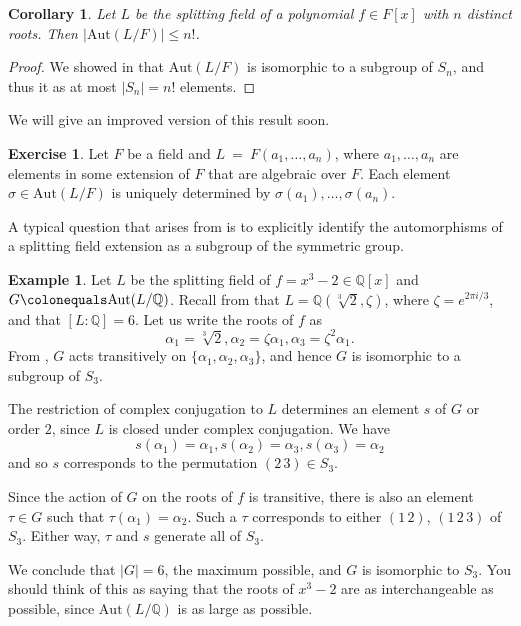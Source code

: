 \documentclass[12pt]{report}
\newtheorem{corollary}[theorem]{Corollary}
\numberwithin{equation}{section}
\numberwithin{theorem}{chapter}
\theoremstyle{definition}
\newtheorem{example}[theorem]{Example}
\newtheorem{exercise}{Exercise}
\newtheorem*{basic properties}{Basic Properties}
\newtheorem*{Important Remark}{Important Remark}
\begin{document}
\begin{corollary}
Let $L$ be the splitting field of a polynomial $f \in F[x]$ with $n$ distinct roots. Then $|\mathrm{Aut}(L/F)| \leqslant n!$.
\end{corollary}

\begin{proof}
	We showed in  that $\mathrm{Aut}(L/F)$ is isomorphic to a subgroup of $S_n$, and thus it as at most $|S_n| = n!$ elements.
\end{proof}

We will give an improved version of this result soon.


\begin{exercise}\label{aut elements determined by image of gens}
Let $F$ be a field and $L~=~F(a_1, \ldots, a_n)$, where $a_1,\ldots, a_n$ are elements in some extension of $F$ that are algebraic over $F$. Each element $\sigma \in \mathrm{Aut}(L/F)$ is uniquely determined by $\sigma(a_1),\ldots, \sigma(a_n)$.
\end{exercise}

A typical question that arises from  is to explicitly identify the automorphisms of a splitting field extension as a subgroup of the symmetric group.

\begin{example} 
Let $L$ be the splitting field of $f = x^3-2 \in \mathbb{Q}[x]$ and $G \colonequals \mathrm{Aut}(L/\mathbb{Q})$. Recall from  that $L = \mathbb{Q}(\sqrt[3]{2}, \zeta)$, where $\zeta = e^{2 \pi i/3}$, and that $[L:\mathbb{Q}] = 6$.
Let us write the roots of $f$ as 
$$\alpha_1 = \sqrt[3]{2}, \alpha_2 = \zeta \alpha_1, \alpha_3 = \zeta^2 \alpha_1.$$
From , $G$ acts transitively on $\{\alpha_1, \alpha_2, \alpha_3\}$, and hence $G$ is isomorphic to a subgroup of $S_3$.

The restriction of complex conjugation to $L$ determines an element $s$ of $G$ or order $2$, since $L$ is closed under complex conjugation. We have 
$$s(\alpha_1) = \alpha_1, s(\alpha_2) = \alpha_3, s(\alpha_3) = \alpha_2$$
and so $s$ corresponds to the permutation $(2 \, 3) \in S_3$.

Since the action of $G$ on the roots of $f$ is transitive, there is also an element $\tau \in G$ such that $\tau(\alpha_1) = \alpha_2$. Such a $\tau$ corresponds to either $(1 \, 2)$, $(1 \, 2 \, 3)$ of $S_3$. Either way, $\tau$ and $s$ generate all of $S_3$.

We conclude that $|G| = 6$, the maximum possible, and $G$ is isomorphic to $S_3$. You should think of this as saying that the roots of $x^3 -2$ are as interchangeable as possible, since $\mathrm{Aut}(L/\mathbb{Q})$ is as large as possible. 
\end{example}
\end{document}
